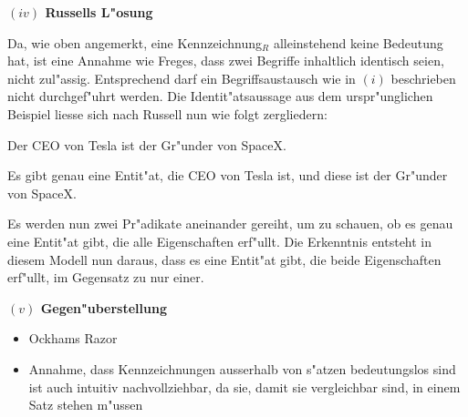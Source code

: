 \documentclass[a4paper, emulatestandardclasses, 12pt]{scrartcl}
\begin{document}
\begin{onehalfspace}
\vspace{3mm}

\noindent\textbf{$(iv)$ Russells L"osung}

Da, wie oben angemerkt, eine Kennzeichnung$_{R}$ alleinstehend keine Bedeutung hat, ist eine Annahme wie Freges, dass zwei Begriffe inhaltlich identisch seien, nicht zul"assig. Entsprechend darf ein Begriffsaustausch wie in $(i)$ beschrieben nicht durchgef"uhrt werden. Die Identit"atsaussage aus dem urspr"unglichen Beispiel liesse sich nach Russell nun wie folgt zergliedern:

\begin{description}[leftmargin=!,labelwidth=\widthof{\bfseries Zergliederung}]
    \item[Originalsatz] Der CEO von Tesla ist der Gr"under von SpaceX.
    \item[Zergliederung] Es gibt genau eine Entit"at, die CEO von Tesla ist, und diese ist der Gr"under von SpaceX. 
\end{description}

Es werden nun zwei Pr"adikate aneinander gereiht, um zu schauen, ob es genau eine Entit"at gibt, die alle Eigenschaften erf"ullt. Die Erkenntnis entsteht in diesem Modell nun daraus, dass es eine Entit"at gibt, die beide Eigenschaften erf"ullt, im Gegensatz zu nur einer.

\vspace{3mm}

\noindent\textbf{$(v)$ Gegen"uberstellung}

\begin{itemize}
  \item Ockhams Razor
  \item Annahme, dass Kennzeichnungen ausserhalb von s"atzen bedeutungslos sind ist auch intuitiv nachvollziehbar, da sie, damit sie vergleichbar sind, in einem Satz stehen m"ussen 
\end{itemize}


\end{onehalfspace}


\end{document}
